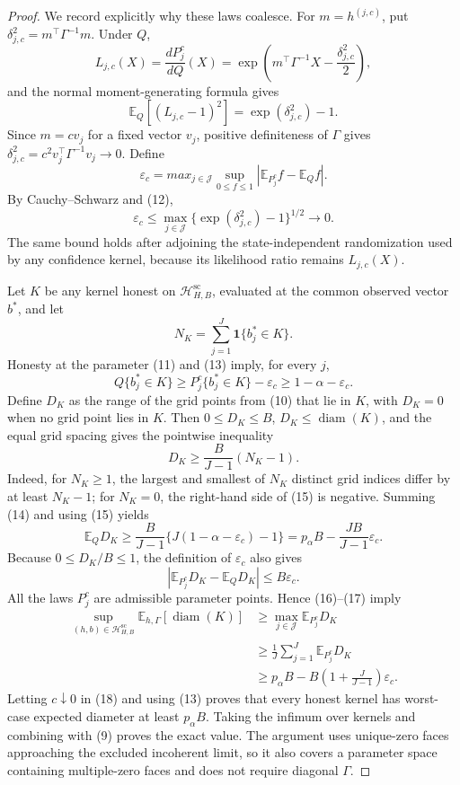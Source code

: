 \documentclass{article}
\begin{document}
\begin{proof}
We record explicitly why these laws coalesce. For \(m=h^{(j,c)}\), put \(\delta_{j,c}^2=m^{\top}\Gamma^{-1}m\). Under \(Q\),
\[
 L_{j,c}(X)=\frac{dP_j^c}{dQ}(X)
 =\exp\!\left(m^{\top}\Gamma^{-1}X-\frac{\delta_{j,c}^2}{2}\right),
\]
and the normal moment-generating formula gives
\[
 \mathbb E_Q[(L_{j,c}-1)^2]=\exp(\delta_{j,c}^2)-1.
 \tag{12}
\]
Since \(m=c v_j\) for a fixed vector \(v_j\), positive definiteness of \(\Gamma\) gives \(\delta_{j,c}^2=c^2v_j^{\top}\Gamma^{-1}v_j\to0\). Define
\[
 \varepsilon_c=max_{j\in\mathcal J}
 \sup_{0\leq f\leq1}
 \left|\mathbb E_{P_j^c}f-\mathbb E_Qf\right|.
\]
By Cauchy--Schwarz and (12),
\[
 \varepsilon_c
 \leq\max_{j\in\mathcal J}
 \{\exp(\delta_{j,c}^2)-1\}^{1/2}
 \longrightarrow0.
 \tag{13}
\]
The same bound holds after adjoining the state-independent randomization used by any confidence kernel, because its likelihood ratio remains \(L_{j,c}(X)\).

Let \(K\) be any kernel honest on \(\mathcal H_{H,B}^{\mathrm{sc}}\), evaluated at the common observed vector \(b^*\), and let
\[
 N_K=\sum_{j=1}^J\mathbf 1\{b_j^*\in K\}.
\]
Honesty at the parameter (11) and (13) imply, for every \(j\),
\[
 Q\{b_j^*\in K\}
 \geq P_j^c\{b_j^*\in K\}-\varepsilon_c
 \geq1-\alpha-\varepsilon_c.
 \tag{14}
\]
Define \(D_K\) as the range of the grid points from (10) that lie in \(K\), with \(D_K=0\) when no grid point lies in \(K\). Then \(0\leq D_K\leq B\), \(D_K\leq\operatorname{diam}(K)\), and the equal grid spacing gives the pointwise inequality
\[
 D_K\geq\frac{B}{J-1}(N_K-1).
 \tag{15}
\]
Indeed, for \(N_K\geq1\), the largest and smallest of \(N_K\) distinct grid indices differ by at least \(N_K-1\); for \(N_K=0\), the right-hand side of (15) is negative. Summing (14) and using (15) yields
\[
 \mathbb E_QD_K
 \geq\frac{B}{J-1}\{J(1-\alpha-\varepsilon_c)-1\}
 =p_\alpha B-\frac{JB}{J-1}\varepsilon_c.
 \tag{16}
\]
Because \(0\leq D_K/B\leq1\), the definition of \(\varepsilon_c\) also gives
\[
 \left|\mathbb E_{P_j^c}D_K-\mathbb E_QD_K\right|
 \leq B\varepsilon_c.
 \tag{17}
\]
All the laws \(P_j^c\) are admissible parameter points. Hence (16)--(17) imply
\[
\begin{aligned}
 \sup_{(h,b)\in\mathcal H_{H,B}^{\mathrm{sc}}}
 \mathbb E_{h,\Gamma}[\operatorname{diam}(K)]
 &\geq \max_{j\in\mathcal J}\mathbb E_{P_j^c}D_K\\
 &\geq \frac1J\sum_{j=1}^J\mathbb E_{P_j^c}D_K\\
 &\geq p_\alpha B
 -B\left(1+\frac{J}{J-1}\right)\varepsilon_c.
\end{aligned}
 \tag{18}
\]
Letting \(c\downarrow0\) in (18) and using (13) proves that every honest kernel has worst-case expected diameter at least \(p_\alpha B\). Taking the infimum over kernels and combining with (9) proves the exact value. The argument uses unique-zero faces approaching the excluded incoherent limit, so it also covers a parameter space containing multiple-zero faces and does not require diagonal \(\Gamma\).


\end{proof}
\end{document}
